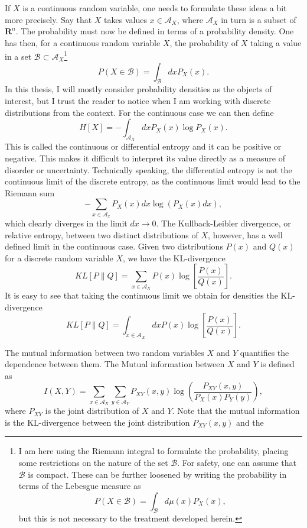 If $X$ is a continuous random variable, one needs to formulate these ideas a bit more precisely. Say that $X$ takes values $x \in \mathcal{A}_X$, where
$\mathcal{A}_X$ in turn is a subset of $\mathbf{R}^n$. The probability must now be defined in terms of a probability density. One has then, for a continuous random 
variable $X$, the probability of $X$ taking a value in a set $\mathcal{B} \subset \mathcal{A}_X$\footnote{I am here using the Riemann integral to formulate the probability, placing some restrictions on the nature of the set $\mathcal{B}$. For safety, one can assume that $\mathcal{B}$ is compact. These can
be further loosened by writing the probability in terms of the Lebesgue measure as \[P(X \in \mathcal{B}) = \int_{\mathcal{B}} d\mu(x) P_X(x),\] but this is not necessary
to the treatment developed herein.}
\[
P(X \in \mathcal{B}) = \int_{\mathcal{B}} dx P_X(x).
\]
In this thesis, I will mostly consider probability densities as the objects of interest, but I trust the reader to notice when
I am working with discrete distributions from the context. For the continuous case we can then define
\[
H[X] = -\int_{\mathcal{A}_X} dx P_X(x) \log P_X(x).
\]
This is called the continuous or differential entropy and it can be positive or negative. This makes it difficult to interpret its value directly as a measure of disorder
or uncertainty. Technically speaking, the differential entropy is not the continuous limit of the discrete entropy, as the
continuous limit would lead to the Riemann sum
\[
-\sum_{x\in\mathcal{A}_x} P_X(x) dx \log \left(P_X(x) dx\right),
\]
which clearly diverges in the limit $dx\to 0$. The Kullback-Leibler divergence, or relative entropy, between two distinct distributions of $X$, however, has a well defined 
limit in the continuous 
case. Given two distributions $P(x)$ and $Q(x)$ for a discrete random variable $X$, we have the KL-divergence
\[
KL[P\|Q] = \sum_{x\in\mathcal{A}_X} P(x) \log \left[\frac{P(x)}{Q(x)}\right].
\]
It is easy to see that taking the continuous limit we obtain for densities the KL-divergence
\[
KL[P\|Q] = \int_{x\in\mathcal{A}_X} dx P(x) \log \left[\frac{P(x)}{Q(x)}\right].
\]
\par
The mutual information between two random variables $X$ and $Y$ quantifies the dependence between them. The Mutual 
information between $X$ and $Y$ is defined as
\[
I(X,Y) = \sum_{x \in \mathcal{A}_X} \sum_{y\in\mathcal{A}_Y} P_{XY}(x,y) \log\left(\frac{P_{XY}(x,y)}{P_X(x)P_Y(y)}\right),
\]
where $P_{XY}$ is the joint distribution of $X$ and $Y$. Note that the mutual information is the KL-divergence between the joint distribution $P_{XY}(x,y)$ and the
